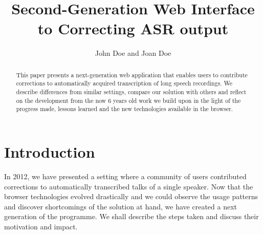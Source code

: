 \documentclass{svproc}
\begin{document}
\mainmatter              %
%
\title{Second-Generation Web Interface to Correcting ASR output}
%
%
\author{John Doe and Joan Doe}
%
%
%

\maketitle              %

\begin{abstract}
This paper presents a next-generation web application that enables users to
contribute corrections to automatically acquired transcription of long speech
recordings. We describe differences from similar settings, compare our solution
with others and reflect on the development from the now 6 years old work we
build upon in the light of the progress made, lessons learned and the new
technologies available in the browser.
\end{abstract}

\section{Introduction}

In 2012\cite{kruuza2012making}, we have presented a setting where a community of
users contributed corrections to automatically transcribed talks of a single
speaker. Now that the browser technologies evolved drastically and we could
observe the usage patterns and discover shortcomings of the solution at hand, we
have created a next generation of the programme. We shall describe the steps
taken and discuss their motivation and impact.
\end{document}

